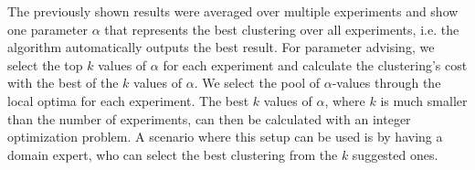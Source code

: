 The previously shown results were averaged over multiple experiments and show one parameter $\alpha$ that represents the best clustering over all experiments, i.e. the algorithm automatically outputs the best result. For parameter advising, we select the top $k$ values of $\alpha$ for each experiment and calculate the clustering's cost with the best of the $k$ values of $\alpha$. We select the pool of $\alpha$-values through the local optima for each experiment. The best $k$ values of $\alpha$, where $k$ is much smaller than the number of experiments, can then be calculated with an integer optimization problem. A scenario where this setup can be used is by having a domain expert, who can select the best clustering from the $k$ suggested ones.

